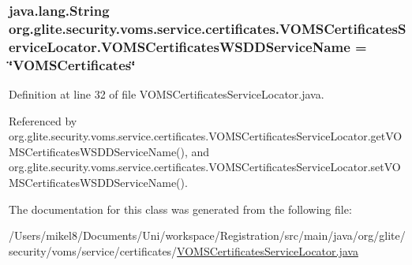 \hypertarget{classorg_1_1glite_1_1security_1_1voms_1_1service_1_1certificates_1_1VOMSCertificatesServiceLocator_a5d515083d0068ae83a20615787bf03d3}{
\subsubsection[{VOMSCertificatesWSDDServiceName}]{\setlength{\rightskip}{0pt plus 5cm}java.lang.String {\bf org.glite.security.voms.service.certificates.VOMSCertificatesServiceLocator.VOMSCertificatesWSDDServiceName} = \char`\"{}VOMSCertificates\char`\"{}}}
\label{classorg_1_1glite_1_1security_1_1voms_1_1service_1_1certificates_1_1VOMSCertificatesServiceLocator_a5d515083d0068ae83a20615787bf03d3}


Definition at line 32 of file VOMSCertificatesServiceLocator.java.



Referenced by org.glite.security.voms.service.certificates.VOMSCertificatesServiceLocator.getVOMSCertificatesWSDDServiceName(), and org.glite.security.voms.service.certificates.VOMSCertificatesServiceLocator.setVOMSCertificatesWSDDServiceName().



The documentation for this class was generated from the following file:\begin{DoxyCompactItemize}
\item 
/Users/mikel8/Documents/Uni/workspace/Registration/src/main/java/org/glite/security/voms/service/certificates/\hyperlink{VOMSCertificatesServiceLocator_8java}{VOMSCertificatesServiceLocator.java}\end{DoxyCompactItemize}
